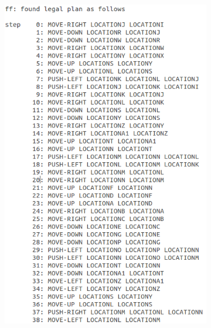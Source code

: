 \documentclass[10pt, letter]{article}
\begin{document}
\begin{figure} [h!]
\centering
\begin{subfigure}{.5\textwidth}
  \centering
  \includegraphics[scale = 0.3]{images/FF_Solution_p2_3_1}
\end{subfigure}%
\begin{subfigure}{.5\textwidth}
  \centering

\end{subfigure}
\end{figure}
\end{document}
